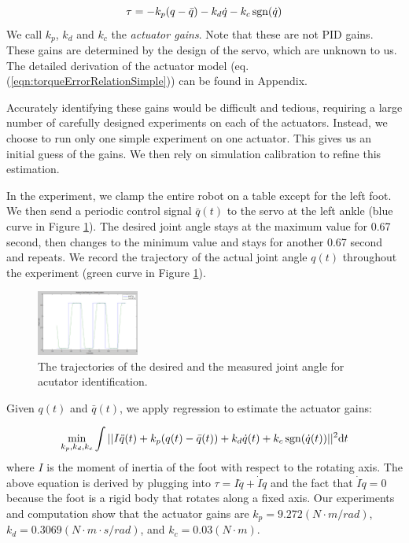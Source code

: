 \begin{equation}
  \tau = -k_p(q-\bar{q}) - k_d\dot{q} - k_c\operatorname{sgn}(\dot{q})\\
    \label{eqn:torqueErrorRelationSimple}
\end{equation}
We call $k_p$, $k_d$ and $k_c$ the \emph{actuator gains}. Note that these are not PID gains. These gains are determined by the design of the servo, which are unknown to us. The detailed derivation of the actuator model (eq. (\ref{eqn:torqueErrorRelationSimple})) can be found in Appendix.

Accurately identifying these gains would be difficult and tedious, requiring a large number of carefully designed experiments on each of the actuators. Instead, we choose to run only one simple experiment on one actuator. This gives us an initial guess of the gains. We then rely on simulation calibration to refine this estimation.

In the experiment, we clamp the entire robot on a table except for the left foot. We then send a periodic control signal $\bar{q}(t)$ to the servo at the left ankle (blue curve in Figure \ref{fig:actuatorId}). The desired joint angle stays at the maximum value for 0.67 second, then changes to the minimum value and stays for another 0.67 second and repeats. We record the trajectory of the actual joint angle $q(t)$ throughout the experiment (green curve in Figure \ref{fig:actuatorId}). 

\begin{figure}[!t]
  \centering
  \includegraphics[width=0.3\textwidth]{figures/actuatorId}
  \caption{The trajectories of the desired and the measured joint angle for acutator identification.}
  \vspace{-0.1in}
  \label{fig:actuatorId}
\end{figure}

Given $q(t)$ and $\bar{q}(t)$, we apply regression to estimate the actuator gains:

\begin{displaymath}
\min_{k_p, k_d, k_c}\int||I\ddot{q}(t)+k_p(q(t)-\bar{q}(t)) + k_d\dot{q}(t) + k_c\operatorname{sgn}(\dot{q}(t))||^2\mathrm{d}t
\end{displaymath}
where $I$ is the moment of inertia of the foot with respect to the rotating axis. The above equation is derived by plugging into $\tau = I\ddot{q}+\dot{I}\dot{q}$ and the fact that $\dot{I}\dot{q}=0$ because the foot is a rigid body that rotates along a fixed axis. Our experiments and computation show that the actuator gains are $k_p=9.272(N\cdot m/rad)$, $k_d=0.3069(N\cdot m\cdot s/rad)$, and $k_c=0.03(N\cdot m)$. 



